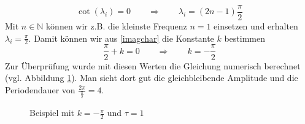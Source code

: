 \begin{equation}
	\cot(\lambda_i) = 0 \qquad\Rightarrow\qquad \lambda_i = (2n-1)\frac{\pi}{2}
\end{equation}
Mit $n\in \mathbb{N}$ können wir z.B. die kleinste Frequenz $n=1$ einsetzen und erhalten $\lambda_i = \frac{\pi}{2}$.
Damit können wir aus \eqref{imagchar} die Konstante $k$ bestimmen
\begin{equation}
	\frac{\pi}{2} + k = 0 \qquad\Rightarrow\qquad k = -\frac{\pi}{2}
\end{equation}
Zur Überprüfung wurde mit diesen Werten die Gleichung numerisch berechnet (vgl. Abbildung \ref{fig:bsp_chareq}).
Man sieht dort gut die gleichbleibende Amplitude und die Periodendauer von $\frac{2\pi}{\frac{\pi}{2}}=4$.

\begin{figure}
	\centering
	
	\caption{Beispiel mit $k=-\frac{\pi}{2}$ und $\tau=1$}
	\label{fig:bsp_chareq}
\end{figure}
